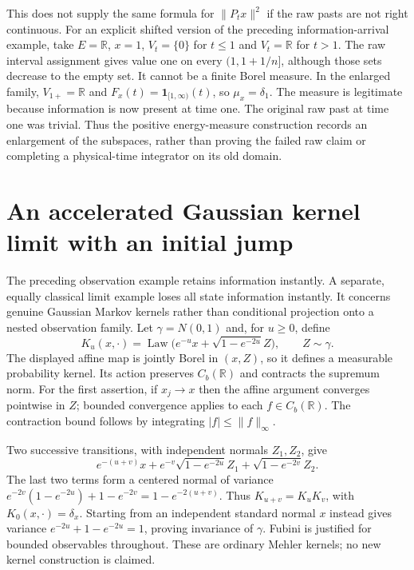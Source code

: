 \documentclass[11pt]{article}
\newcommand{\R}{\mathbb R}\newcommand{\E}{\mathbb E}
\begin{document}
This does not supply the same formula for $\|P_tx\|^2$ if the raw
pasts are not right continuous. For an explicit shifted version of
the preceding information-arrival example, take $E=\R$, $x=1$,
$V_t=\{0\}$ for $t\le1$ and $V_t=\R$ for $t>1$.
The raw interval assignment gives value one on every
$(1,1+1/n]$, although those sets decrease to the empty set.
It cannot be a finite Borel measure. In the enlarged family,
$V_{1+}=\R$ and $F_x(t)=\mathbf1_{[1,\infty)}(t)$, so
$\mu_x=\delta_1$. The measure is legitimate because information
is now present at time one. The original raw past at time one was
trivial. Thus the positive energy-measure construction records an
enlargement of the subspaces, rather than proving the failed raw
claim or completing a physical-time integrator on its old domain.

\section{An accelerated Gaussian kernel limit with an initial jump}
\label{sec:instantkernel}
The preceding observation example retains information instantly. A
separate, equally classical limit example loses all state information
instantly. It concerns genuine Gaussian Markov kernels rather than
conditional projection onto a nested observation family.
Let $\gamma=N(0,1)$ and, for $u\geq0$, define
\[
 K_u(x,\cdot)=\operatorname{Law}
 \bigl(e^{-u}x+\sqrt{1-e^{-2u}}Z\bigr),\qquad Z\sim\gamma.
\]
The displayed affine map is jointly Borel in $(x,Z)$, so it defines
a measurable probability kernel. Its action preserves $C_b(\R)$
and contracts the supremum norm. For the first assertion, if
$x_j\to x$ then the affine argument converges pointwise in $Z$;
bounded convergence applies to each $f\in C_b(\R)$. The contraction
bound follows by integrating $|f|\leq\|f\|_\infty$.

Two successive transitions, with independent normals $Z_1,Z_2$, give
\[
 e^{-(u+v)}x+e^{-v}\sqrt{1-e^{-2u}}Z_1
                      +\sqrt{1-e^{-2v}}Z_2.
\]
The last two terms form a centered normal of variance
$e^{-2v}(1-e^{-2u})+1-e^{-2v}=1-e^{-2(u+v)}$.
Thus $K_{u+v}=K_uK_v$, with $K_0(x,\cdot)=\delta_x$.
Starting from an independent standard normal $x$ instead gives
variance $e^{-2u}+1-e^{-2u}=1$, proving invariance of $\gamma$.
Fubini is justified for bounded observables throughout. These are
ordinary Mehler kernels; no new kernel construction is claimed.
\end{document}
